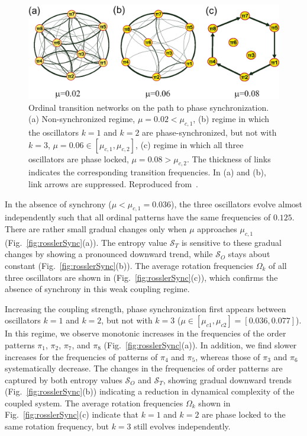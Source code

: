 \begin{figure}
	\centering
	\includegraphics[width=0.8\columnwidth]{Chapter05_TransitionNt/sync_net.eps}
\caption{Ordinal transition networks on the path to phase synchronization. (a) Non-synchronized regime, $\mu = 0.02 < \mu_{c,1}$, (b) regime in which the oscillators $k=1$ and $k=2$ are phase-synchronized, but not with $k=3$, $\mu = 0.06 \in [\mu_{c,1}, \mu_{c,2}]$, (c) regime in which all three oscillators are phase locked, $\mu = 0.08 > \mu_{c,2}$. The thickness of links indicates the corresponding transition frequencies. In (a) and (b), link arrows are suppressed. Reproduced from~\cite{Zhang2017b}. \label{fig:rosslerSyncNet}}
\end{figure}

In the absence of synchrony ($\mu < \mu_{c,1}=0.036$), the three oscillators evolve almost independently such that all ordinal patterns have the same frequencies of $0.125$. There are rather small gradual changes only when $\mu$ approaches $\mu_{c,1}$ (Fig.~\ref{fig:rosslerSync}(a)). The entropy value $\mathcal{S}_T$ is sensitive to these gradual changes by showing a pronounced downward trend, while $\mathcal{S}_O$ stays about constant (Fig.~\ref{fig:rosslerSync}(b)). The average rotation frequencies $\Omega_k$ of all three oscillators are shown in (Fig.~\ref{fig:rosslerSync}(c)), which confirms the absence of synchrony in this weak coupling regime.

Increasing the coupling strength, phase synchronization first appears between oscillators $k=1$ and $k=2$, but not with $k=3$ ($\mu \in [\mu_{c1}, \mu_{c2}] =[0.036, 0.077]$). In this regime, we observe monotonic increases in the frequencies of the order patterns $\pi_1$, $\pi_2$, $\pi_7$, and $\pi_8$ (Fig.~\ref{fig:rosslerSync}(a)). In addition, we find slower increases for the frequencies of patterns of $\pi_4$ and $\pi_5$, whereas those of $\pi_3$ and $\pi_6$ systematically decrease. The changes in the frequencies of order patterns are captured by both entropy values $\mathcal{S}_O$ and $\mathcal{S}_T$, showing gradual downward trends (Fig.~\ref{fig:rosslerSync}(b)) indicating a reduction in dynamical complexity of the coupled system. The average rotation frequencies $\Omega_k$ shown in Fig.~\ref{fig:rosslerSync}(c) indicate that $k=1$ and $k=2$ are phase locked to the same rotation frequency, but $k=3$ still evolves independently.

